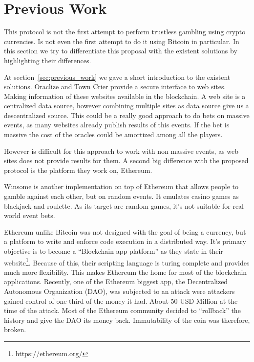 \section{Previous Work} \label{sec:discussion_previous_work}

This protocol is not the first attempt to perform trustless gambling using
  crypto currencies.
Is not even the first attempt to do it using Bitcoin in particular.
In this section we try to differentiate this proposal with the existent
  solutions by highlighting their differences.

At section~\ref{sec:previous_work} we gave a short introduction to the existent
  solutions.
Oraclize and Town Crier provide a secure interface to web sites.
Making information of these websites available in the blockchain.
A web site is a centralized data source, however combining multiple sites as
  data source give us a descentralized source.
This could be a really good approach to do bets on massive events, as
  many websites already publish results of this events.
If the bet is massive the cost of the oracles could be amortized among
  all the players.

However is difficult for this approach to work with non massive events, as
  web sites does not provide results for them.
A second big difference with the proposed protocol is the platform they work
  on, Ethereum.

Winsome is another implementation on top of Ethereum that allows people to
  gamble against each other, but on random events.
It emulates casino games as blackjack and roulette.
As its target are random games, it's not suitable for real world event bets.

Ethereum unlike Bitcoin was not designed with the goal of being a currency,
  but a platform to write and enforce code execution in a distributed
  way.
It's primary objective is to become a ``Blockchain app platform'' as they
  state in their website\footnote{https://ethereum.org/}.
Because of this, their scripting language is turing complete and provides much
  more flexibility.
This makes Ethereum the home for most of the blockchain applications.
Recently, one of the Ethereum biggest app, the Decentralized Autonomous
  Organization (DAO), was subjected to an attack were attackers gained control
  of one third of the money it had.
About 50 USD Million at the time of the attack.
Most of the Ethereum community decided to ``rollback'' the history and give the
  DAO its money back.
Immutability of the coin was therefore, broken.

